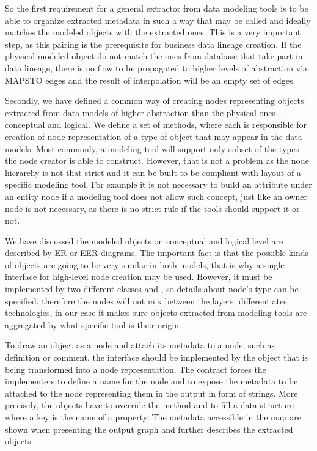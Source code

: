 So the first requirement for a general extractor from data modeling tools is to be able to organize extracted metadata in such a way that  may be called and ideally matches the modeled objects with the extracted ones.
This is a very important step, as this pairing is the prerequisite for business data lineage creation. If the physical modeled object do not match the ones from database that take part in data lineage, there is no flow to be propagated to higher levels of abstraction via MAPS\textunderscore TO edges and the result of interpolation will be an empty set of edges.

Secondly, we have defined a common way of creating nodes representing objects extracted from data models of higher abstraction than the physical ones - conceptual and logical.
We define a set of methods, where each is responsible for creation of node representation of a type of object that may appear in the data models. Most commonly, a modeling tool will support only subset of the types the node creator is able to construct. 
However, that is not a problem as the node hierarchy is not that strict and it can be built to be compliant with layout of a specific modeling tool. 
For example it is not necessary to build an attribute under an entity node if a modeling tool does not allow such concept, just like an owner node is not necessary, as there is no strict rule if the tools should support it or not.

We have discussed the modeled objects on conceptual and logical level are described by ER or EER diagrams. 
The important fact is that the possible kinds of objects are going to be very similar in both models, that is why a single interface  for high-level node creation may be used.
However, it must be implemented by two different classes  and , so details about node's type can be specified, therefore the nodes will not mix between the layers.
 differentiates technologies, in our case it makes sure objects extracted from modeling tools are aggregated by what specific tool is their origin.

To draw an object as a node and attach its metadata to a node, such as definition or comment, the  interface should be implemented by the object that is being transformed into a node representation.
The contract forces the implementers to define a name for the node and to expose the metadata to be attached to the node representing them in the output in form of strings. 
More precisely, the objects have to override the  method and to fill a  data structure where a key is the name of a property. 
The metadata accessible in the map are shown when presenting the output graph and further describes the extracted objects. \\ 

